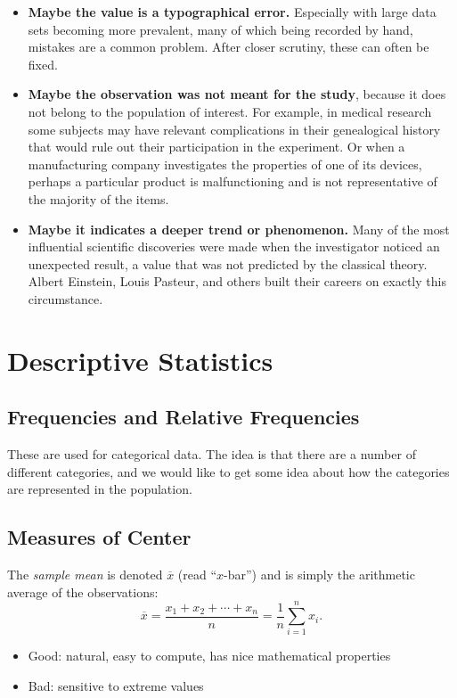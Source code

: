 \documentclass[captions=tableheading]{scrbook}
\begin{document}
\begin{itemize}
\item \textbf{Maybe the value is a typographical error.} Especially with large data sets becoming more prevalent, many of which being recorded by hand, mistakes are a common problem. After closer scrutiny, these can often be fixed.
\item \textbf{Maybe the observation was not meant for the study}, because it does not belong to the population of interest. For example, in medical research some subjects may have relevant complications in their genealogical history that would rule out their participation in the experiment. Or when a manufacturing company investigates the properties of one of its devices, perhaps a particular product is malfunctioning and is not representative of the majority of the items.
\item \textbf{Maybe it indicates a deeper trend or phenomenon.} Many of the most influential scientific discoveries were made when the investigator noticed an unexpected result, a value that was not predicted by the classical theory. Albert Einstein, Louis Pasteur, and others built their careers on exactly this circumstance.
\end{itemize}
\section{Descriptive Statistics}
\label{sec-3-3}

\label{sec:Descriptive-Statistics}
\subsection{Frequencies and Relative Frequencies}
\label{sec-3-3-1}

\label{sub:Frequencies-and-Relative}

These are used for categorical data. The idea is that there are a number of different categories, and we would like to get some idea about how the categories are represented in the population. 
\subsection{Measures of Center}
\label{sec-3-3-2}

\label{sub:Measures-of-Center}

The \emph{sample mean} is denoted \(\overline{x}\) (read ``\(x\)-bar'') and is simply the arithmetic average of the observations:
\begin{equation} 
\overline{x}=\frac{x_{1}+x_{2}+\cdots+x_{n}}{n}=\frac{1}{n}\sum_{i=1}^{n}x_{i}.
\end{equation}
\begin{itemize}
\item Good: natural, easy to compute, has nice mathematical properties
\item Bad: sensitive to extreme values
\end{itemize}
\end{document}
